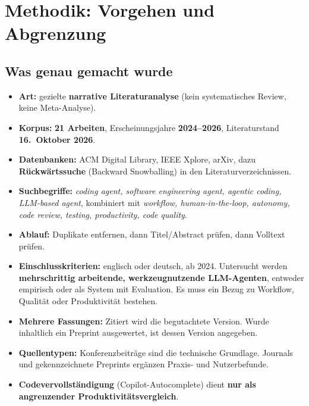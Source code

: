 \documentclass[12pt,a4paper]{article}
\begin{document}
\section{Methodik: Vorgehen und Abgrenzung}
\label{sec:methode}

\subsection{Was genau gemacht wurde}
\begin{itemize}
  \item \textbf{Art:} gezielte \textbf{narrative Literaturanalyse} (kein systematisches Review, keine Meta-Analyse).
  \item \textbf{Korpus:} \textbf{21 Arbeiten}, Erscheinungsjahre \textbf{2024--2026}, Literaturstand \textbf{16.~Oktober 2026}.
  \item \textbf{Datenbanken:} ACM Digital Library, IEEE Xplore, arXiv, dazu \textbf{Rückwärtssuche} (Backward Snowballing) in den Literaturverzeichnissen.
  \item \textbf{Suchbegriffe:} \emph{coding agent, software engineering agent, agentic coding, LLM-based agent}, kombiniert mit \emph{workflow, human-in-the-loop, autonomy, code review, testing, productivity, code quality}.
  \item \textbf{Ablauf:} Duplikate entfernen, dann Titel/Abstract prüfen, dann Volltext prüfen.
  \item \textbf{Einschlusskriterien:} englisch oder deutsch, ab 2024. Untersucht werden \textbf{mehrschrittig arbeitende, werkzeugnutzende LLM-Agenten}, entweder empirisch oder als System mit Evaluation. Es muss ein Bezug zu Workflow, Qualität oder Produktivität bestehen.
  \item \textbf{Mehrere Fassungen:} Zitiert wird die begutachtete Version. Wurde inhaltlich ein Preprint ausgewertet, ist dessen Version angegeben.
  \item \textbf{Quellentypen:} Konferenzbeiträge sind die technische Grundlage. Journals und gekennzeichnete Preprints ergänzen Praxis- und Nutzerbefunde.
  \item \textbf{Codevervollständigung} (Copilot-Autocomplete) dient \textbf{nur als angrenzender Produktivitätsvergleich}.
\end{itemize}
\end{document}

